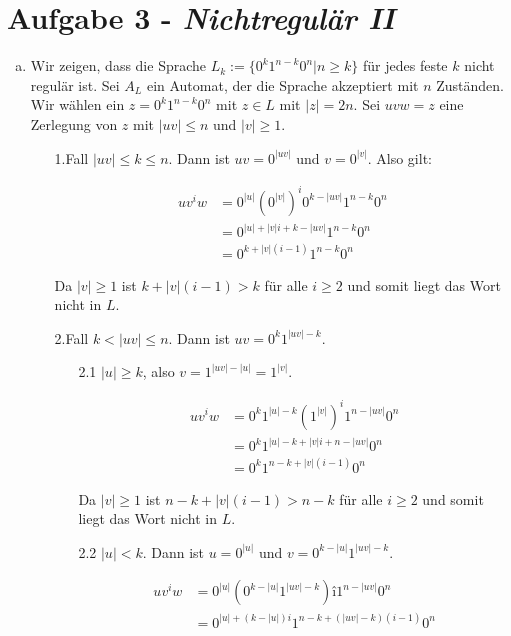 \documentclass{article}
\begin{document}
\section*{Aufgabe 3 - \textit{Nichtregulär II}}
\begin{enumerate}[a)]
	\item Wir zeigen, dass die Sprache $L_k := \{0^k 1^{n-k} 0^n | n \ge k \}$ für jedes feste $k$ nicht regulär ist. Sei $A_L$ ein Automat, der die Sprache akzeptiert mit $n$ Zuständen. Wir wählen ein $z = 0^k 1^{n-k} 0^{n}$ mit $z \in L$ mit $|z| = 2n$. Sei $uvw = z$ eine Zerlegung von $z$ mit $|uv| \le n$ und $|v| \ge 1$.
	
	\begin{enumerate}
		\item[1.Fall] $|uv| \le k \le n$. Dann ist $uv = 0^{|uv|}$ und $v = 0^{|v|}$. Also gilt:
		
		\begin{align}
			uv^iw &= 0^{|u|} (0^{|v|})^i 0^{k - |uv|} 1^{n-k} 0^n\\
			&= 0^{|u|+|v|i + k -|uv|} 1^{n-k} 0^n\\
			&= 0^{k + |v|(i-1)}1^{n-k} 0^n
		\end{align}
		
		Da $|v| \ge 1$ ist $k + |v|(i-1) > k $ für alle $i\ge 2$ und somit liegt das Wort nicht in $L$.
		
		\item[2.Fall] $k < |uv| \le n$. Dann ist $uv = 0^k 1^{|uv| - k}$.
		\begin{enumerate}
			\item[2.1] $|u| \ge k$, also $v = 1^{|uv|-|u|} = 1^{|v|}$.
			
			\begin{align}
				uv^i w &= 0^k 1^{|u|-k} (1^{|v|})^i 1^{n-|uv|}0^n\\
				&= 0^k 1^{|u| - k + |v|i + n -|uv|} 0^n\\
				&= 0^k 1^{n-k + |v|(i-1)} 0^n
			\end{align}
			
		Da $|v| \ge 1$ ist $n - k + |v|(i-1) > n-k$ für alle $i\ge 2$ und somit liegt das Wort nicht in $L$.\\
			
			\item[2.2] $|u| < k$. Dann ist $u = 0^{|u|}$ und $v = 0^{k-|u|}1^{|uv|-k}$.
			
			\begin{align}
				uv^i w &= 0^{|u|} (0^{k-|u|} 1^{|uv|-k})î 1^{n-|uv|} 0^n\\
				&= 0^{|u|+(k-|u|)i} 1^{n-k + (|uv|-k)(i-1)} 0^n
			\end{align}
			

\end{enumerate}
\end{enumerate}
\end{enumerate}
\end{document}
